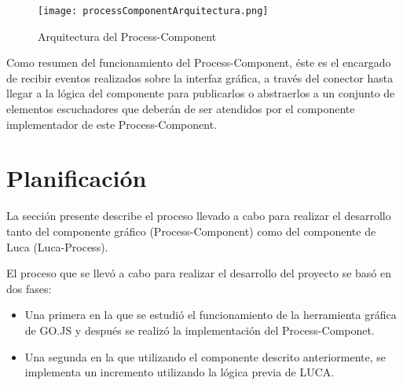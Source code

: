 \begin{figure}[H]
	\centering
	\texttt{[image: processComponentArquitectura.png]}
	\caption{Arquitectura del Process-Component}\label{fig:processComponent}
\end{figure}

Como resumen del funcionamiento del Process-Component, éste es el encargado de recibir eventos realizados sobre la interfaz gráfica, a través del conector hasta llegar a la lógica del componente para publicarlos o abstraerlos a un conjunto de elementos escuchadores que deberán de ser atendidos por el componente implementador de este Process-Component.


\section{Planificación}

La sección presente describe el proceso llevado a cabo para realizar el desarrollo tanto del componente gráfico (Process-Component) como del componente de Luca (Luca-Process).

El proceso que se llevó a cabo para realizar el desarrollo del proyecto se basó en dos fases:
	
\begin{itemize}
		\item  Una primera en la que se estudió el funcionamiento de la herramienta gráfica de GO.JS y después se realizó la implementación del Process-Componet.
		\item  Una segunda en la que utilizando el componente descrito anteriormente, se implementa un incremento utilizando la lógica previa de LUCA.
	\end{itemize}


